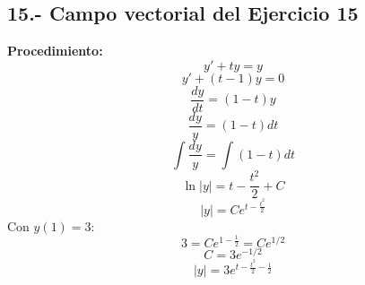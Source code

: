 \documentclass[12pt]{article}
\begin{document}
\vspace{1cm}

\subsection*{15.- Campo vectorial del Ejercicio 15}
\begin{minipage}[t]{0.5\textwidth}
\textbf{Procedimiento:}
\[
y' + ty = y
\]
\[
y' + (t-1)y = 0
\]
\[
\frac{dy}{dt} = (1-t)y
\]
\[
\frac{dy}{y}=(1-t)dt
\]
\[
\int\frac{dy}{y}=\int(1-t)dt
\]
\[
\ln|y|=t-\frac{t^2}{2}+C
\]
\[
|y|=Ce^{t-\frac{t^2}{2}}
\]
Con $y(1)=3$:
\[
3=Ce^{1-\frac{1}{2}}=Ce^{1/2}
\]
\[
C=3e^{-1/2}
\]
\[
|y|=3e^{t-\frac{t^2}{2}-\frac12}
\]
\end{minipage}
\hfill
\begin{minipage}[t]{0.45\textwidth}
\begin{center}
\end{center}
\end{minipage}
\end{document}
